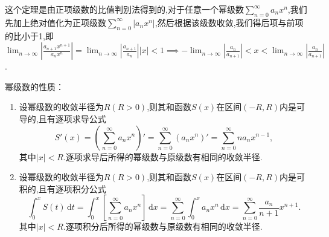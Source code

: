 这个定理是由正项级数的比值判别法得到的,对于任意一个幂级数$\sum _{n=0}^{\infty}a_nx^n$,我们先加上绝对值化为正项级数$\sum _{n=0}^{\infty}\left\lvert a_nx^n\right\rvert $,然后根据该级数收敛,我们得后项与前项的比小于1,即$\lim_{n \to \infty}\left\lvert \frac{a_{n
+1}x^{n+1}}{a_nx^n}\right\rvert =\lim_{n \to \infty}\left\lvert \frac{a_{n+1}}{a_n}\right\rvert \left\lvert x\right\rvert <1 \implies -\lim_{n \to \infty}\left\lvert \frac{a_n}{a_{n
+1}}\right\rvert <x<\lim_{n \to \infty}\left\lvert \frac{a_n}{a_{n
+1}}\right\rvert $.

幂级数的性质：
\begin{enumerate}
    \item 设幂级数的收敛半径为$R(R>0)$,则其和函数$S(x)$在区间$(-R,R)$内是可导的,且有逐项求导公式
        \begin{equation*}
            S'(x)=\left( \sum_{n=0}^{\infty} a_nx^n \right)'=\sum_{n=0}^{\infty} (a_nx^n)'=\sum_{n=0}^{\infty} na_nx^{n-1},
        \end{equation*}
    其中$\left\lvert x\right\rvert <R$.逐项求导后所得的幂级数与原级数有相同的收敛半径.
    \item 设幂级数的收敛半径为$R(R>0)$,则其和函数$S(x)$在区间$(-R,R)$内是可积的,且有逐项积分公式
        \begin{equation*}
            \int_{0}^{x} S(t) \,\mathrm{d}t =\int_{0}^{x} \left[\sum_{n=0}^{\infty} a_nx^n\right]  \,\mathrm{d}x =\sum_{n=0}^{\infty} \int_{0}^{x} a_nx^n \,\mathrm{d}x =\sum_{n=0}^{\infty} \frac{a_n}{n+1}x^{n+1}.
        \end{equation*}
        其中$\left\lvert x\right\rvert <R$.逐项积分后所得的幂级数与原级数有相同的收敛半径.
\end{enumerate}

